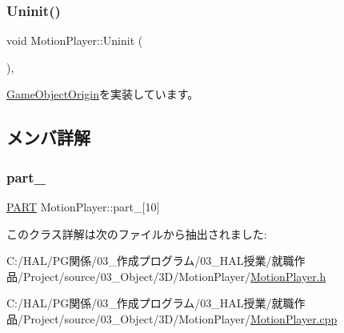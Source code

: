 \subsubsection{\texorpdfstring{Uninit()}{Uninit()}}
{\footnotesize\ttfamily void Motion\+Player\+::\+Uninit (\begin{DoxyParamCaption}{ }\end{DoxyParamCaption})\hspace{0.3cm}{\ttfamily [override]}, {\ttfamily [virtual]}}



\mbox{\hyperlink{class_game_object_origin_aeac8fc4a1f625982313a9a60dd35d016}{Game\+Object\+Origin}}を実装しています。



\subsection{メンバ詳解}
\mbox{\label{class_motion_player_a8d402bc6caa1ef15a549313ab0d6aa66}} 
\subsubsection{\texorpdfstring{part\+\_\+}{part\_}}
{\footnotesize\ttfamily \mbox{\hyperlink{struct_motion_player_1_1_p_a_r_t}{P\+A\+RT}} Motion\+Player\+::part\+\_\+\mbox{[}10\mbox{]}}



このクラス詳解は次のファイルから抽出されました\+:\begin{DoxyCompactItemize}
\item 
C\+:/\+H\+A\+L/\+P\+G関係/03\+\_\+作成プログラム/03\+\_\+\+H\+A\+L授業/就職作品/\+Project/source/03\+\_\+\+Object/3\+D/\+Motion\+Player/\mbox{\hyperlink{_motion_player_8h}{Motion\+Player.\+h}}\item 
C\+:/\+H\+A\+L/\+P\+G関係/03\+\_\+作成プログラム/03\+\_\+\+H\+A\+L授業/就職作品/\+Project/source/03\+\_\+\+Object/3\+D/\+Motion\+Player/\mbox{\hyperlink{_motion_player_8cpp}{Motion\+Player.\+cpp}}\end{DoxyCompactItemize}
